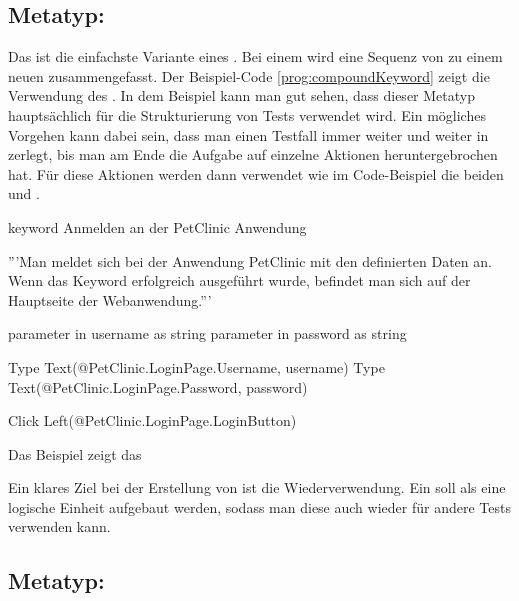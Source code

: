 \subsection{Metatyp: }

Das  ist die einfachste Variante eines . Bei einem  wird eine Sequenz von  zu einem neuen  zusammengefasst. Der Beispiel-Code \ref{prog:compoundKeyword} zeigt die Verwendung des  . In dem Beispiel kann man gut sehen, dass dieser Metatyp hauptsächlich für die Strukturierung von Tests verwendet wird. Ein mögliches Vorgehen kann dabei sein, dass man einen Testfall immer weiter und weiter in  zerlegt, bis man am Ende die Aufgabe auf einzelne Aktionen heruntergebrochen hat. Für diese Aktionen werden dann  verwendet wie im Code-Beispiel die beiden   und .

\begin{program}
\begin{JavaCode}
keyword Anmelden an der PetClinic Anwendung {
	'''Man meldet sich bei der Anwendung PetClinic mit den definierten 
	   Daten an. Wenn das Keyword erfolgreich ausgeführt wurde, 
	   befindet man sich auf der Hauptseite der Webanwendung.'''
	
	parameter in username as string
	parameter in password as string
	
	Type Text(@PetClinic.LoginPage.Username, username)
	Type Text(@PetClinic.LoginPage.Password, password)
	
	Click Left(@PetClinic.LoginPage.LoginButton)
}
\end{JavaCode}
\caption{Das Beispiel zeigt das  }
\label{prog:compoundKeyword}
\end{program}

\SuperPar
Ein klares Ziel bei der Erstellung von  ist die Wiederverwendung. Ein  soll als eine logische Einheit aufgebaut werden, sodass man diese auch wieder für andere Tests verwenden kann. 


\subsection{Metatyp: }

